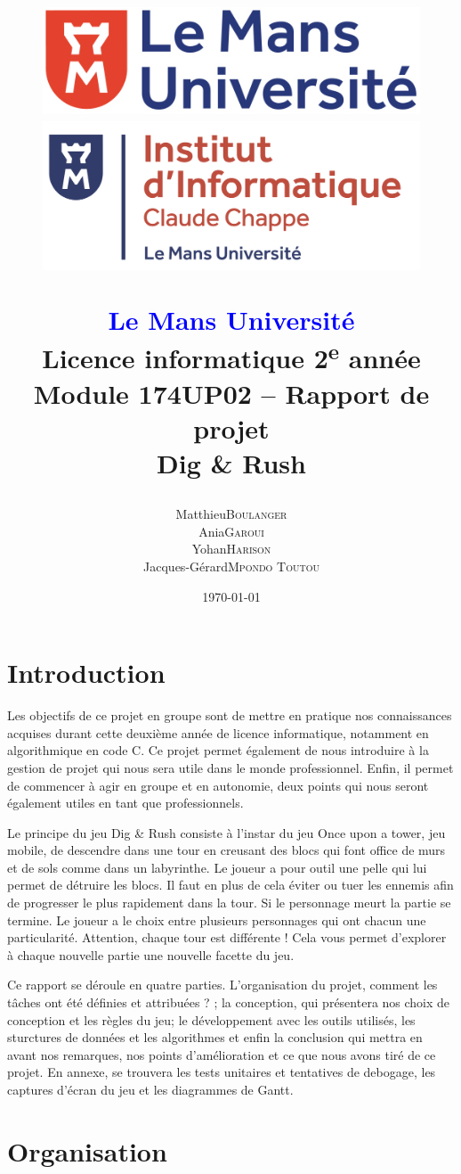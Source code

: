 \documentclass[a4paper,12pt]{article}
\title{
    \begin{figure}[!t]
	\begin{minipage}{.25\textwidth}
	    \includegraphics[width=\textwidth]{img/logo_lmu.png}
	\end{minipage}
	\hspace{.5\textwidth}
	\begin{minipage}{.25\textwidth}
	    \includegraphics[width=\textwidth]{img/logo_ic2.png}
	\end{minipage}
    \end{figure}
    \begin{center}
	\textbf{\textcolor{blue}{Le Mans Université}} \\
	Licence informatique 2\textsuperscript{e} année \\
	Module 174UP02 – Rapport de projet \\
	\textbf{Dig \& Rush}
    \end{center}
}
\author{
	\begin{tabular}{rl}
	    Matthieu & \textsc{Boulanger} \\
	    Ania & \textsc{Garoui} \\
	    Yohan & \textsc{Harison} \\
	    Jacques-Gérard & \textsc{Mpondo Toutou}
	\end{tabular}
}
\date{\today}
\begin{document}
\maketitle
\newpage

\tableofcontents
\newpage


\section{Introduction}

Les objectifs de ce projet en groupe sont de mettre en pratique nos connaissances acquises durant cette deuxième année de licence informatique, notamment en algorithmique en code C.
Ce projet permet également de nous introduire à la gestion de projet qui nous sera utile dans le monde professionnel. 
Enfin, il permet de commencer à agir en groupe et en autonomie, deux points qui nous seront également utiles en tant que professionnels.

Le principe du jeu Dig \& Rush consiste à l’instar du jeu Once upon a tower, jeu mobile, de descendre dans une tour en creusant des blocs qui font office de murs et de sols comme dans un labyrinthe. Le joueur a pour outil une pelle qui lui permet de détruire les blocs. Il faut en plus de cela éviter ou tuer les ennemis afin de progresser le plus rapidement dans la tour. Si le personnage meurt la partie se termine. Le joueur a le choix entre plusieurs personnages qui ont chacun une particularité. Attention, chaque tour est différente ! Cela vous permet d’explorer à chaque nouvelle partie une nouvelle facette du jeu.

Ce rapport se déroule en quatre parties. L’organisation du projet, comment les tâches ont été définies et attribuées ? ; la conception, qui présentera nos choix de conception et les règles du jeu; le développement avec les outils utilisés, les sturctures de données et les algorithmes et enfin la conclusion qui mettra en avant nos remarques, nos points d’amélioration et ce que nous avons tiré de ce projet. En annexe, se trouvera les tests unitaires et tentatives de debogage, les captures d’écran du jeu et les diagrammes de Gantt.

\newpage
\section{Organisation}
\end{document}
